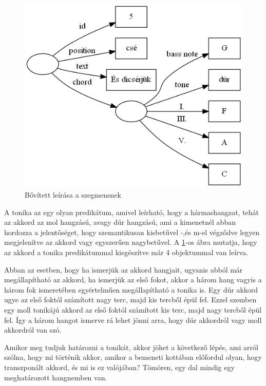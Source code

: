 \begin{figure}[h]
	\includegraphics[scale=0.5]{images/img_src/rdf_graph_4.png}
	\caption{Bővített leírása a szegmensnek}
	\label{fig:graph4}
\end{figure}
A tonika az egy olyan predikátum, amivel leírható, hogy a hármashangzat, tehát az akkord az mol hangzású, avagy dúr hangzású, ami a kimenetnél abban hordozza a jelentőséget, hogy szemantikusan kisbetűvel -,és m-el végződve legyen megjelenítve az akkord vagy egyszerűen nagybetűvel. A \ref{fig:graph4}-os ábra mutatja, hogy az akkord a tonika predikátummal kiegészítve már 4 objektummal van leírva.
\par
Abban az esetben, hogy ha ismerjük az akkord hangjait, ugyanis abból már megállapítható az akkord, ha ismerjük az első fokot, akkor a három hang vagyis a három fok ismeretében egyértelműen megállapítható a tonika is. Egy dúr akkord ugye az első foktól számított nagy terc, majd kis tercből épül fel. Ezzel szemben egy moll tonikájú akkord az első foktól számított kis terc, majd nagy tercből épül fel. Így a három hangot ismerve rá lehet jönni arra, hogy dúr akkordról vagy moll akkordról van szó.
\par
Amikor meg tudjuk határozni a tonikát, akkor jöhet a következő lépés, ami arról szólna, hogy mi történik akkor, amikor a bemeneti kottában előfordul olyan, hogy transzponált akkord, és mi is ez valójában? Tömören, egy dal mindig egy meghatározott hangnemben van.
\newpage
